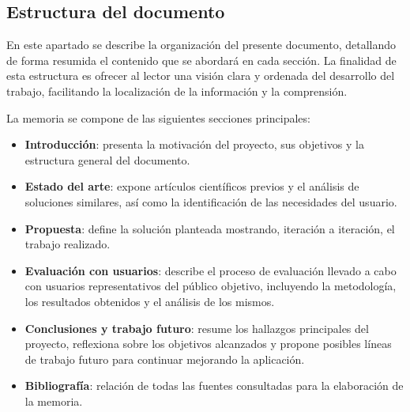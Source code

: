 \subsection{Estructura del documento}

En este apartado se describe la organización del presente documento, detallando de forma resumida el contenido que se abordará en cada sección. 
La finalidad de esta estructura es ofrecer al lector una visión clara y ordenada del desarrollo del trabajo, facilitando la localización de la información y la comprensión.

La memoria se compone de las siguientes secciones principales:

\begin{itemize}
    \item \textbf{Introducción}: presenta la motivación del proyecto, sus objetivos y la estructura general del documento.
    \item \textbf{Estado del arte}: expone artículos científicos previos y el análisis de soluciones similares, así como la identificación de las necesidades del usuario.
    \item \textbf{Propuesta}: define la solución planteada mostrando, iteración a iteración, el trabajo realizado.
    \item \textbf{Evaluación con usuarios}: describe el proceso de evaluación llevado a cabo con usuarios representativos del público objetivo, incluyendo la metodología, los resultados obtenidos y el análisis de los mismos.
    \item \textbf{Conclusiones y trabajo futuro}: resume los hallazgos principales del proyecto, reflexiona sobre los objetivos alcanzados y propone posibles líneas de trabajo futuro para continuar mejorando la aplicación.
    \item \textbf{Bibliografía}: relación de todas las fuentes consultadas para la elaboración de la memoria.
\end{itemize}
